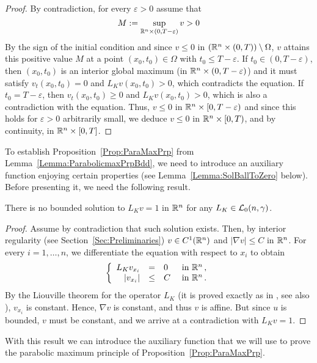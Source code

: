 \begin{proof}
By contradiction, for every $\varepsilon > 0$ assume that 
$$
M:=\sup_{\mathbb{R}^n \times (0,T-\varepsilon)}v > 0
$$
By the sign of the initial condition and since $v \leq 0 $ in $(\mathbb{R}^n \times (0,T))\setminus \Omega$, $v$  attains this positive value $M$ at a point $(x_0,t_0) \in \Omega$ with $t_0\leq T-\varepsilon$. If $t_0\in(0,T-\varepsilon)$, then $(x_0,t_0)$ is an interior global maximum (in $\mathbb{R}^n \times (0,T-\varepsilon)$) and it must satisfy $v_t(x_0,t_0)=0$ and $L_K v(x_0,t_0)>0$, which contradicts the equation. If $t_0 = T-\varepsilon$, then $v_t(x_0,t_0)\geq 0$ and $L_K v(x_0,t_0)>0$, which is also a contradiction with the equation. Thus, $v\leq 0$ in $\mathbb{R}^n\times [0,T-\varepsilon)$ and since this holds for $\varepsilon>0$ arbitrarily small, we deduce $v\leq 0$ in $\mathbb{R}^n\times [0,T)$, and by continuity, in $\mathbb{R}^n\times [0,T]$.
\end{proof}

To establish Proposition~\ref{Prop:ParaMaxPrp} from Lemma~\ref{Lemma:ParabolicmaxPrpBdd}, we need to introduce an auxiliary function enjoying certain properties (see Lemma~\ref{Lemma:SolBallToZero} below). Before presenting it, we need the following result.

\begin{lemma}
\label{Lemma:NoBddSolL=1}
There is no bounded solution to $L_K v=1$ in $\mathbb{R}^n$ for any $L_K \in \mathcal{L}_0(n,\gamma)$.
\end{lemma}

\begin{proof}
Assume by contradiction that such solution exists. Then, by interior regularity (see Section~\ref{Sec:Preliminaries}) $v\in C^1(\mathbb{R}^n)$ and $|\nabla v|\leq C$ in $\mathbb{R}^n$. For every $i = 1,\ldots, n$, we differentiate the equation with respect to $x_i$ to obtain
\begin{equation*}
\left\{\begin{array}{rcll}
L_K  v_{x_i} &=& 0 & \textrm{ in } \mathbb{R}^n\,,\\
|v_{x_i}| &\leq& C & \textrm{ in } \mathbb{R}^n\,.
\end{array} \right.
\end{equation*}
By the Liouville theorem for the operator $L_K $ (it is proved exactly as in \cite{RosOtonSerra-Stable}, see also \cite{SerraC2s+alphaRegularity}), $v_{x_i}$ is constant. Hence, $\nabla v$ is constant, and thus $v$ is affine. But since $u$ is bounded, $v$ must be constant, and we arrive at a contradiction with $L_K v=1$.
\end{proof}

With this result we can introduce the auxiliary function that we will use to prove the parabolic maximum principle of Proposition~\ref{Prop:ParaMaxPrp}.

